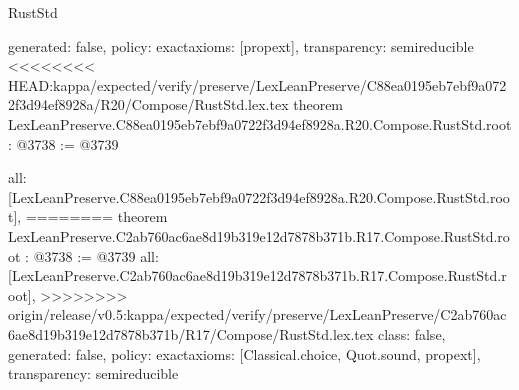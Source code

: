 \begin{lexlean}{RustStd}
\begin{coremodule}
{\begin{coremodule}
{{{{  generated: false,
  policy: exact{axioms: [propext]},
  transparency: semireducible
}
<<<<<<<< HEAD:kappa/expected/verify/preserve/LexLeanPreserve/C88ea0195eb7ebf9a0722f3d94ef8928a/R20/Compose/RustStd.lex.tex
theorem LexLeanPreserve.C88ea0195eb7ebf9a0722f3d94ef8928a.R20.Compose.RustStd.root : @3738 := @3739 {
  all: [LexLeanPreserve.C88ea0195eb7ebf9a0722f3d94ef8928a.R20.Compose.RustStd.root],
========
theorem LexLeanPreserve.C2ab760ac6ae8d19b319e12d7878b371b.R17.Compose.RustStd.root : @3738 := @3739 {
  all: [LexLeanPreserve.C2ab760ac6ae8d19b319e12d7878b371b.R17.Compose.RustStd.root],
>>>>>>>> origin/release/v0.5:kappa/expected/verify/preserve/LexLeanPreserve/C2ab760ac6ae8d19b319e12d7878b371b/R17/Compose/RustStd.lex.tex
  class: false,
  generated: false,
  policy: exact{axioms: [Classical.choice, Quot.sound, propext]},
  transparency: semireducible
}

}}}}
\end{coremodule}}
\end{coremodule}
\end{lexlean}
